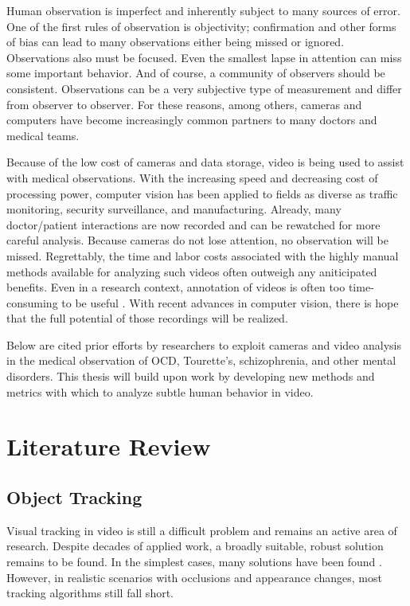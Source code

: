 \documentclass[11pt]{article}
\newcounter{list}
\begin{document}
Human observation is imperfect and inherently subject to many sources of error. One of the first rules of observation is objectivity; confirmation and other forms of bias can lead to many observations either being missed or ignored. Observations also must be focused. Even the smallest lapse in attention can miss some important behavior. And of course, a community of observers should be consistent. Observations can be a very subjective type of measurement and differ from observer to observer. For these reasons, among others, cameras and computers have become increasingly common partners to many doctors and medical teams.

Because of the low cost of cameras and data storage, video is being used to assist with medical observations. With the increasing speed and decreasing cost of processing power, computer vision has been applied to fields as diverse as traffic monitoring\cite{Gupte}, security surveillance\cite{bird2006}, and manufacturing\cite{saurez2018}. Already, many doctor/patient interactions are now recorded and can be rewatched for more careful analysis. Because cameras do not lose attention, no observation will be missed. Regrettably, the time and labor costs associated with the highly manual methods available for analyzing such videos often outweigh any aniticipated benefits. Even in a research context, annotation of videos is often too time-consuming to be useful\cite{fasching2016} \cite{walkup1992}. With recent advances in computer vision, there is hope that the full potential of those recordings will be realized.

Below are cited prior efforts by researchers to exploit cameras and video analysis in the medical observation of OCD, Tourette's, schizophrenia, and other mental disorders.  This thesis will build upon work by developing new methods and metrics with which to analyze subtle human behavior in video.

\section{Literature Review}
\subsection{Object Tracking}
Visual tracking in video is still a difficult problem and remains an active area of research. Despite decades of applied work, a broadly suitable, robust solution remains to be found. In the simplest cases, many solutions have been found \cite{comaniciu2002} \cite{bradski98}. However, in realistic scenarios with occlusions and appearance changes, most tracking algorithms still fall short.
\end{document}
